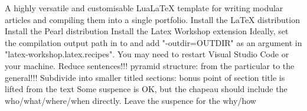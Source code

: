 \markdownRendererDocumentBegin
\markdownRendererSectionBegin
{}\markdownRendererInterblockSeparator
{}A highly versatile and customisable LuaLaTeX template for writing modular articles and compiling them into a single portfolio.\markdownRendererInterblockSeparator
{}\markdownRendererSectionBegin
\markdownRendererSectionBegin
{}\markdownRendererInterblockSeparator
{}\markdownRendererSectionBegin
{}\markdownRendererInterblockSeparator
{}\markdownRendererSectionBegin
{}\markdownRendererInterblockSeparator
{}\markdownRendererUlBeginTight
\markdownRendererUlItem Install the LaTeX distribution \markdownRendererUlItemEnd 
\markdownRendererUlItem Install the Pearl distribution \markdownRendererUlItemEnd 
\markdownRendererUlItem Install the Latex Workshop extension\markdownRendererUlItemEnd 
\markdownRendererUlItem Ideally, set the compilation output path in  to\markdownRendererUlItemEnd 
\markdownRendererUlEndTight \markdownRendererInterblockSeparator
{}\markdownRendererInterblockSeparator
{}and add "-outdir=\markdownRendererPercentSign{}OUTDIR\markdownRendererPercentSign{}" as an argument in "latex-workshop.latex.recipes".\markdownRendererInterblockSeparator
{}\markdownRendererBlockQuoteBegin
You may need to restart Visual Studio Code or your machine.
\markdownRendererBlockQuoteEnd \markdownRendererInterblockSeparator
{}
\markdownRendererSectionEnd 
\markdownRendererSectionEnd 
\markdownRendererSectionEnd \markdownRendererSectionBegin
{}\markdownRendererInterblockSeparator
{}\markdownRendererUlBeginTight
\markdownRendererUlItem Reduce sentences!!!\markdownRendererUlItemEnd 
\markdownRendererUlItem pyramid structure: from the particular to the general!!!\markdownRendererUlItemEnd 
\markdownRendererUlItem Subdivide into smaller titled sections: bonus point of section title is lifted from the text\markdownRendererUlItemEnd 
\markdownRendererUlItem Some suspence is OK, but the chapeau should include the who/what/where/when directly. Leave the suspence for the why/how\markdownRendererUlItemEnd 
